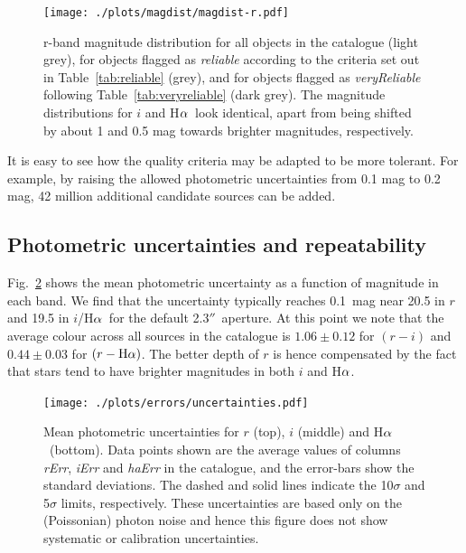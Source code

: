\documentclass[useAMS,usenatbib]{mn2e}
\def\ha{\mbox{H$\rm \alpha$}}
\def\arcsec{$''$}
\begin{document}
\begin{figure}
    \texttt{[image: ./plots/magdist/magdist-r.pdf]} 
    \caption{r-band magnitude distribution for all objects in the catalogue 
    (light grey), for objects flagged as \emph{reliable} 
    according to the criteria set out in Table~\ref{tab:reliable} (grey),
    and for objects flagged as \emph{veryReliable} 
    following Table~\ref{tab:veryreliable} (dark grey).
    The magnitude distributions for $i$ and \ha\
    look identical, apart from being shifted
    by about 1 and 0.5 mag towards brighter magnitudes,
    respectively.}
    \label{fig:magdist}
\end{figure}

It is easy to see how the quality criteria
may be adapted to be more tolerant.
For example, by raising the allowed photometric uncertainties
from 0.1 mag to 0.2 mag,
42 million additional candidate sources can be added.

\subsection{Photometric uncertainties and repeatability}

Fig.~\ref{fig:uncertainties} shows the mean photometric
uncertainty as a function of magnitude in each band.
We find that the uncertainty typically
reaches 0.1~mag near 20.5 in $r$ 
and 19.5 in $i$/\ha\ for the default 2.3\arcsec\ aperture.
At this point we note that the average colour
across all sources in the catalogue is
$1.06\pm0.12$ for $(r-i)$ and $0.44\pm0.03$ for $(r-\ha)$.
The better depth of $r$ is hence compensated
by the fact that stars tend to have 
brighter magnitudes in both $i$ and \ha.

\begin{figure}
    \texttt{[image: ./plots/errors/uncertainties.pdf]} 
    \caption{Mean photometric uncertainties
             for $r$ (top), $i$ (middle) and \ha\ (bottom).
             Data points shown are the average values of
             columns \emph{rErr}, \emph{iErr} and \emph{haErr}
             in the catalogue, 
             and the error-bars show the standard deviations.
             The dashed and solid lines indicate 
             the 10$\sigma$ and 5$\sigma$ limits, respectively.
             These uncertainties are based only on the (Poissonian)
             photon noise and hence this figure does not show
             systematic or calibration uncertainties.}
    \label{fig:uncertainties}
\end{figure}
\end{document}
